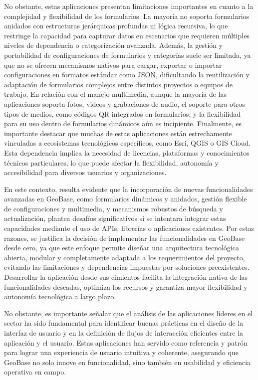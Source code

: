 \documentclass{article}
\begin{document}
No obstante, estas aplicaciones presentan limitaciones importantes en cuanto a la complejidad y flexibilidad de los formularios. La mayoría no soporta formularios anidados con estructuras jerárquicas profundas ni lógica recursiva, lo que restringe la capacidad para capturar datos en escenarios que requieren múltiples niveles de dependencia o categorización avanzada. Además, la gestión y portabilidad de configuraciones de formularios y categorías suele ser limitada, ya que no se ofrecen mecanismos nativos para cargar, exportar o importar configuraciones en formatos estándar como JSON, dificultando la reutilización y adaptación de formularios complejos entre distintos proyectos o equipos de trabajo. En relación con el manejo multimedia, aunque la mayoría de las aplicaciones soporta fotos, videos y grabaciones de audio, el soporte para otros tipos de medios, como códigos QR integrados en formularios, y la flexibilidad para su uso dentro de formularios dinámicos aún es incipiente. Finalmente, es importante destacar que muchas de estas aplicaciones están estrechamente vinculadas a ecosistemas tecnológicos específicos, como Esri, QGIS o GIS Cloud. Esta dependencia implica la necesidad de licencias, plataformas y conocimientos técnicos particulares, lo que puede afectar la flexibilidad, autonomía y accesibilidad para diversos usuarios y organizaciones.

En este contexto, resulta evidente que la incorporación de nuevas funcionalidades avanzadas en GeoBase, como formularios dinámicos y anidados, gestión flexible de configuraciones y multimedia, y mecanismos robustos de búsqueda y actualización, plantea desafíos significativos si se intentara integrar estas capacidades mediante el uso de APIs, librerías o aplicaciones existentes. Por estas razones, se justifica la decisión de implementar las funcionalidades en GeoBase desde cero, ya que este enfoque permite diseñar una arquitectura tecnológica abierta, modular y completamente adaptada a los requerimientos del proyecto, evitando las limitaciones y dependencias impuestas por soluciones preexistentes. Desarrollar la aplicación desde sus cimientos facilita la integración nativa de las funcionalidades deseadas, optimiza los recursos y garantiza mayor flexibilidad y autonomía tecnológica a largo plazo.

No obstante, es importante señalar que el análisis de las aplicaciones líderes en el sector ha sido fundamental para identificar buenas prácticas en el diseño de la interfaz de usuario y en la definición de flujos de interacción eficientes entre la aplicación y el usuario. Estas aplicaciones han servido como referencia y patrón para lograr una experiencia de usuario intuitiva y coherente, asegurando que GeoBase no solo innove en funcionalidad, sino también en usabilidad y eficiencia operativa en campo.
\end{document}
